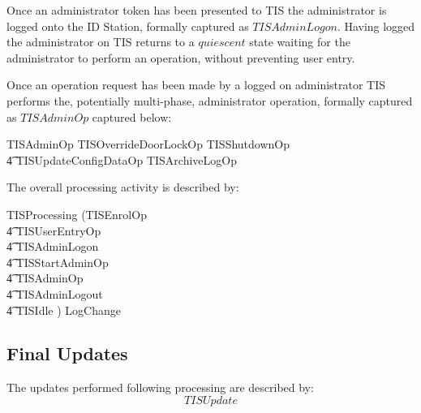 Once an administrator token has been presented to TIS the
administrator is logged onto the ID Station, formally captured as
$TISAdminLogon$. Having logged the administrator on TIS returns to a
$quiescent$ state waiting for the administrator to perform an
operation, without preventing user entry.

Once an operation request has been made by a logged on administrator
TIS performs the, potentially multi-phase, administrator operation,
formally captured as $TISAdminOp$ captured below:

\begin{zed}
        TISAdminOp  TISOverrideDoorLockOp  \lor TISShutdownOp 
\\      \t4     \lor TISUpdateConfigDataOp \lor TISArchiveLogOp
\end{zed}

The overall processing activity is described by:

\begin{zed}
        TISProcessing  (TISEnrolOp
\\ \t4  \lor TISUserEntryOp
\\ \t4  \lor TISAdminLogon 
\\ \t4  \lor TISStartAdminOp
\\ \t4  \lor TISAdminOp 
\\ \t4  \lor TISAdminLogout
\\ \t4  \lor TISIdle ) \land LogChange
\end{zed}

\subsection{Final Updates}
The updates performed following processing are described by:
\[
        TISUpdate
\]


